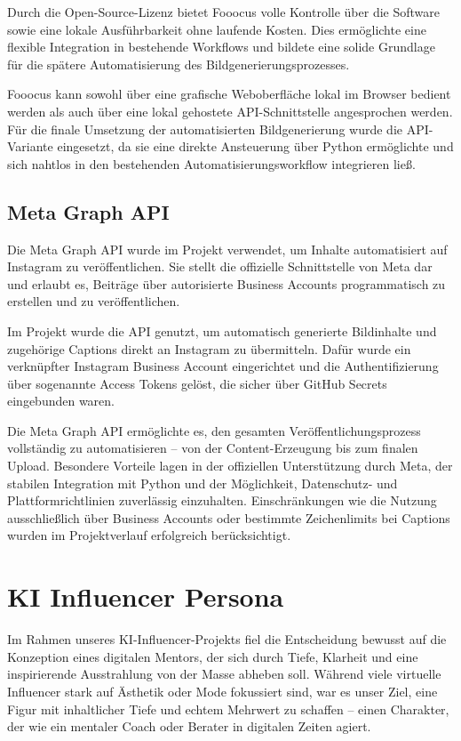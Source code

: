 \documentclass[a4paper,12pt]{article}
\begin{document}
Durch die Open-Source-Lizenz bietet Fooocus volle Kontrolle über die Software sowie eine lokale Ausführbarkeit ohne laufende Kosten. Dies ermöglichte eine flexible Integration in bestehende Workflows und bildete eine solide Grundlage für die spätere Automatisierung des Bildgenerierungsprozesses. 

Fooocus kann sowohl über eine grafische Weboberfläche lokal im Browser bedient werden als auch über eine lokal gehostete API-Schnittstelle angesprochen werden. Für die finale Umsetzung der automatisierten Bildgenerierung wurde die API-Variante eingesetzt, da sie eine direkte Ansteuerung über Python ermöglichte und sich nahtlos in den bestehenden Automatisierungsworkflow integrieren ließ.


\subsection{Meta Graph API}

Die Meta Graph API wurde im Projekt verwendet, um Inhalte automatisiert auf Instagram zu veröffentlichen. Sie stellt die offizielle Schnittstelle von Meta dar und erlaubt es, Beiträge über autorisierte Business Accounts programmatisch zu erstellen und zu veröffentlichen. 

Im Projekt wurde die API genutzt, um automatisch generierte Bildinhalte und zugehörige Captions direkt an Instagram zu übermitteln. Dafür wurde ein verknüpfter Instagram Business Account eingerichtet und die Authentifizierung über sogenannte Access Tokens gelöst, die sicher über GitHub Secrets eingebunden waren. 

Die Meta Graph API ermöglichte es, den gesamten Veröffentlichungsprozess vollständig zu automatisieren – von der Content-Erzeugung bis zum finalen Upload. Besondere Vorteile lagen in der offiziellen Unterstützung durch Meta, der stabilen Integration mit Python und der Möglichkeit, Datenschutz- und Plattformrichtlinien zuverlässig einzuhalten. Einschränkungen wie die Nutzung ausschließlich über Business Accounts oder bestimmte Zeichenlimits bei Captions wurden im Projektverlauf erfolgreich berücksichtigt.


\section{KI Influencer Persona}

Im Rahmen unseres KI-Influencer-Projekts fiel die Entscheidung bewusst auf die Konzeption eines digitalen Mentors, der sich durch Tiefe, Klarheit und eine inspirierende Ausstrahlung von der Masse abheben soll. Während viele virtuelle Influencer stark auf Ästhetik oder Mode fokussiert sind, war es unser Ziel, eine Figur mit inhaltlicher Tiefe und echtem Mehrwert zu schaffen – einen Charakter, der wie ein mentaler Coach oder Berater in digitalen Zeiten agiert.
\end{document}
